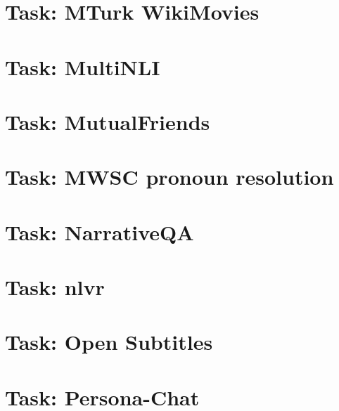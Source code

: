 \documentclass[twoside]{book}
\newcommand{\+}{\discretionary{\mbox{\scriptsize$\hookleftarrow$}}{}{}}
\begin{document}
\chapter{Task\+: M\+Turk Wiki\+Movies}
\label{md_parlai_tasks_mturkwikimovies_README}

\chapter{Task\+: Multi\+N\+LI}
\label{md_parlai_tasks_multinli_README}

\chapter{Task\+: Mutual\+Friends}
\label{md_parlai_tasks_mutualfriends_README}

\chapter{Task\+: M\+W\+SC pronoun resolution}
\label{md_parlai_tasks_mwsc_README}

\chapter{Task\+: Narrative\+QA}
\label{md_parlai_tasks_narrative_qa_README}

\chapter{Task\+: nlvr}
\label{md_parlai_tasks_nlvr_README}

\chapter{Task\+: Open Subtitles}
\label{md_parlai_tasks_opensubtitles_README}

\chapter{Task\+: Persona-\/\+Chat}
\label{md_parlai_tasks_personachat_README}

\end{document}
